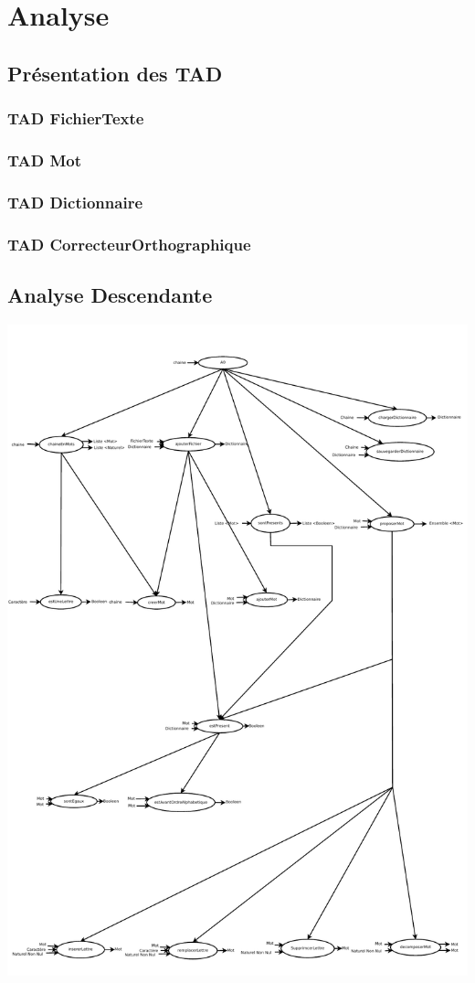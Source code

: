 \section{Analyse}
	\subsection{Présentation des TAD}
		\subsubsection{TAD FichierTexte}
			
			
		\subsubsection{TAD Mot}
			
			
		\subsubsection{TAD Dictionnaire}
			
			
		\subsubsection{TAD CorrecteurOrthographique}
			
			
		\subsection{Analyse Descendante}
			\begin{center}
			\includegraphics[scale=0.6]{images/AnalyseDescendante.pdf}
			\end{center}